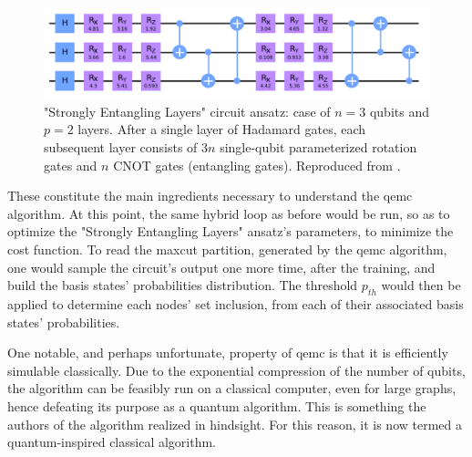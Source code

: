 \begin{figure}[H]
    \centering
    \includegraphics[width = 0.85\linewidth]{Figures/Diagrams/Strongly_Entangling_Layers.png}
    \caption{"Strongly Entangling Layers" circuit ansatz: case of $n = 3$ qubits and $p = 2$ layers. After a single layer of Hadamard gates, each subsequent layer consists of $3n$ single-qubit parameterized rotation gates and $n$ CNOT gates (entangling gates). Reproduced from \cite{tenecohen2023variational}.}
    \label{fig:Strongly_Entangling_Layers}
\end{figure}

These constitute the main ingredients necessary to understand the \acrshort{qemc} algorithm. At this point, the same hybrid loop as before would be run, so as to optimize the "Strongly Entangling Layers" ansatz's parameters, to minimize the cost function. To read the \acrshort{maxcut} partition, generated by the \acrshort{qemc} algorithm, one would sample the circuit's output one more time, after the training, and build the basis states' probabilities distribution. The threshold $p_{th}$ would then be applied to determine each nodes' set inclusion, from each of their associated basis states' probabilities.

One notable, and perhaps unfortunate, property of \acrshort{qemc} is that it is efficiently simulable classically. Due to the exponential compression of the number of qubits, the algorithm can be feasibly run on a classical computer, even for large graphs, hence defeating its purpose as a quantum algorithm. This is something the authors of the algorithm \cite{tenecohen2023variational} realized in hindsight. For this reason, it is now termed a quantum-inspired classical algorithm.






